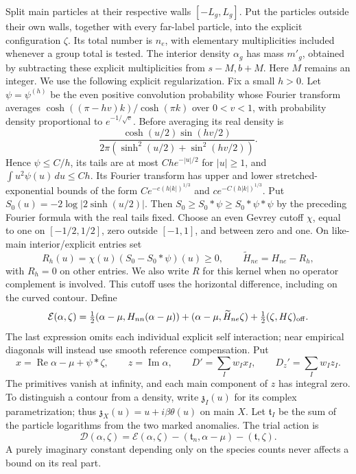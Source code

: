 Split main particles at their respective walls \([-L_g,L_g]\).
Put the particles outside their own walls, together with every far-label
particle, into the explicit configuration \(\zeta\). Its total number is
\(n_e\), with elementary multiplicities included whenever a group total
is tested. The interior density \(\alpha_g\) has mass \(m'_g\), obtained
by subtracting these explicit multiplicities from \(s-M,b+M\).
Here \(M\) remains an integer. We use the following explicit regularization. Fix a small $h>0$.
Let $\psi=\psi^{(h)}$ be the even positive convolution probability
whose Fourier transform averages
$\cosh((\pi-hv)k)/\cosh(\pi k)$ over $0<v<1$, with probability
density proportional to $e^{-1/\sqrt v}$. Before averaging its
real density is
\[
 \frac{\cosh(u/2)\sin(hv/2)}
 {2\pi(\sinh^2(u/2)+\sin^2(hv/2))}.
\]
Hence $\psi\le C/h$, its tails are at most $Ch e^{-|u|/2}$ for
$|u|\ge1$, and $\int u^2\psi(u)\,du\le Ch$. Its Fourier
transform has upper and lower stretched-exponential bounds of the
form $C e^{-c(h|k|)^{1/3}}$ and $c e^{-C(h|k|)^{1/3}}$.
Put $S_0(u)=-2\log|2\sinh(u/2)|$. Then
$S_0\ge S_0*\psi\ge S_0*\psi*\psi$ by the preceding Fourier
formula with the real tails fixed. Choose an even Gevrey cutoff
$\chi$, equal to one on $[-1/2,1/2]$, zero outside $[-1,1]$, and
between zero and one. On like-main interior/explicit entries set
\[
 R_h(u)=\chi(u)(S_0-S_0*\psi)(u)\ge0,\qquad
 \widetilde H_{ne}=H_{ne}-R_h,
\]
with $R_h=0$ on other entries. We also write $R$ for this kernel
when no operator complement is involved. This cutoff uses the
horizontal difference, including on the curved contour. Define
\[
 \mathcal E(\alpha,\zeta)
 =\tfrac12(\alpha-\mu,H_{nn}(\alpha-\mu))
   +(\alpha-\mu,\widetilde H_{ne}\zeta)
   +\tfrac12(\zeta,H\zeta)_{\rm off}.
\]
The last expression omits each individual explicit self interaction;
near empirical diagonals will instead use smooth reference compensation. Put
\[
 x=\operatorname{Re}\alpha-\mu+\psi*\zeta,\qquad
 z=\operatorname{Im}\alpha,\qquad
 D'=\sum_Iw_Ix_I,\qquad D_z'=\sum_Iw_Iz_I.
\]
The primitives vanish at infinity, and each main component of \(z\) has
integral zero. To distinguish a contour from a density, write
\(\mathfrak z_I(u)\) for its complex parametrization; thus
\(\mathfrak z_X(u)=u+i\beta\theta(u)\) on main \(X\).
Let \(\mathfrak t_I\) be the sum of the particle logarithms from the two
marked anomalies. The trial action is
\[
 \mathcal D(\alpha,\zeta)
 =\mathcal E(\alpha,\zeta)
   -(\mathfrak t_n,\alpha-\mu)-(\mathfrak t,\zeta).
\]
A purely imaginary constant depending only on the species counts never
affects a bound on its real part.

